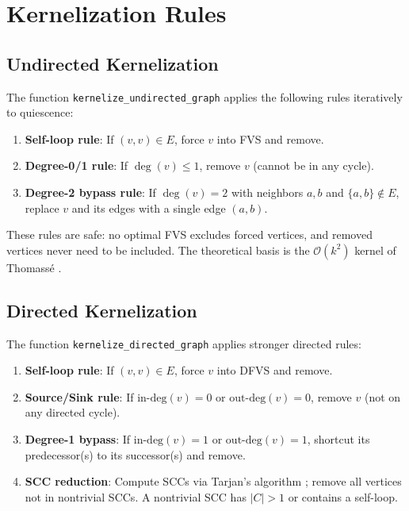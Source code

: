 \documentclass[10pt,a4paper]{report}
\theoremstyle{definition}
\newcommand{\bigO}[1]{\mathcal{O}\!\left(#1\right)}
\begin{document}
\section{Kernelization Rules}

\subsection{Undirected Kernelization}

The function \texttt{kernelize\_undirected\_graph} applies the following rules iteratively to quiescence:

\begin{enumerate}
	\item \textbf{Self-loop rule}: If $(v,v) \in E$, force $v$ into FVS and remove.
	\item \textbf{Degree-0/1 rule}: If $\deg(v) \leq 1$, remove $v$ (cannot be in any cycle).
	\item \textbf{Degree-2 bypass rule}: If $\deg(v) = 2$ with neighbors $a, b$ and $\{a,b\} \notin E$, replace $v$ and its edges with a single edge $(a,b)$.
\end{enumerate}

These rules are safe: no optimal FVS excludes forced vertices, and removed vertices never need to be included. The theoretical basis is the $\bigO{k^2}$ kernel of Thomass\'{e} \cite{thomasse2010}.

\subsection{Directed Kernelization}

The function \texttt{kernelize\_directed\_graph} applies stronger directed rules:

\begin{enumerate}
	\item \textbf{Self-loop rule}: If $(v,v) \in E$, force $v$ into DFVS and remove.
	\item \textbf{Source/Sink rule}: If $\text{in-deg}(v) = 0$ or $\text{out-deg}(v) = 0$, remove $v$ (not on any directed cycle).
	\item \textbf{Degree-1 bypass}: If $\text{in-deg}(v) = 1$ or $\text{out-deg}(v) = 1$, shortcut its predecessor(s) to its successor(s) and remove.
	\item \textbf{SCC reduction}: Compute SCCs via Tarjan's algorithm \cite{tarjan1972}; remove all vertices not in nontrivial SCCs. A nontrivial SCC has $|C| > 1$ or contains a self-loop.
\end{enumerate}
\end{document}
